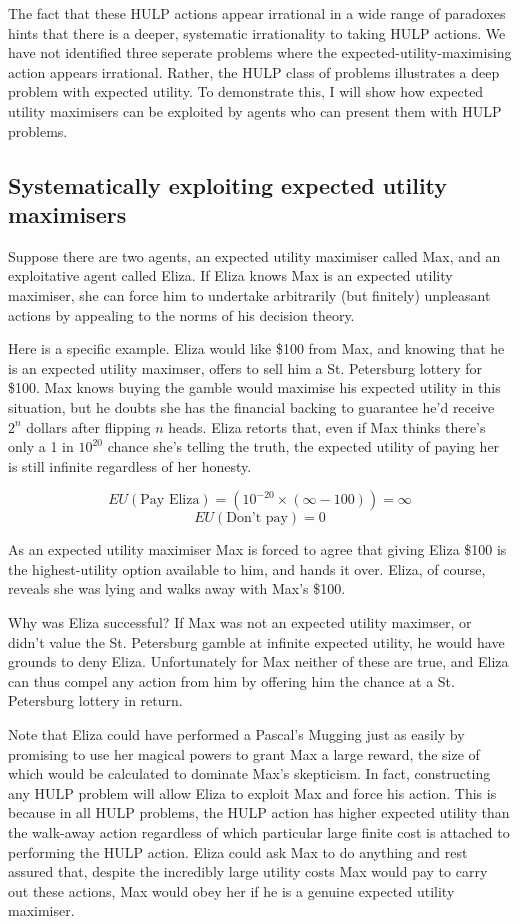 \documentclass{article}
\begin{document}
The fact that these HULP actions appear irrational in a wide range of paradoxes hints that there is a deeper, systematic irrationality to taking HULP actions. We have not identified three seperate problems where the expected-utility-maximising action appears irrational. Rather, the HULP class of problems illustrates a deep problem with expected utility. To demonstrate this, I will show how expected utility maximisers can be exploited by agents who can present them with HULP problems.

\subsection{Systematically exploiting expected utility maximisers}

Suppose there are two agents, an expected utility maximiser called Max, and an exploitative agent called Eliza. If Eliza knows Max is an expected utility maximiser, she can force him to undertake arbitrarily (but finitely) unpleasant actions by appealing to the norms of his decision theory. 

Here is a specific example. Eliza would like \$100 from Max, and knowing that he is an expected utility maximser, offers to sell him a St. Petersburg lottery for \$100. Max knows buying the gamble would maximise his expected utility in this situation, but he doubts she has the financial backing to guarantee he'd receive \(2^n\) dollars after flipping \(n\) heads. Eliza retorts that, even if Max thinks there's only a 1 in \(10^{20}\) chance she's telling the truth, the expected utility of paying her is still infinite regardless of her honesty.

\[EU(\mbox{Pay Eliza})=(10^{-20}\times(\infty-100)) = \infty\]
\[EU(\mbox{Don't pay})=0\]

As an expected utility maximiser Max is forced to agree that giving Eliza \$100 is the highest-utility option available to him, and hands it over. Eliza, of course, reveals she was lying and walks away with Max's \$100.

Why was Eliza successful? If Max was not an expected utility maximser, or didn't value the St. Petersburg gamble at infinite expected utility, he would have grounds to deny Eliza. Unfortunately for Max neither of these are true, and Eliza can thus compel any action from him by offering him the chance at a St. Petersburg lottery in return. 

Note that Eliza could have performed a Pascal's Mugging just as easily by promising to use her magical powers to grant Max a large reward, the size of which would be calculated to dominate Max's skepticism. In fact, constructing any HULP problem will allow Eliza to exploit Max and force his action. This is because in all HULP problems, the HULP action has higher expected utility than the walk-away action regardless of which particular large finite cost is attached to performing the HULP action. Eliza could ask Max to do anything and rest assured that, despite the incredibly large utility costs Max would pay to carry out these actions, Max would obey her if he is a genuine expected utility maximiser.
\end{document}

